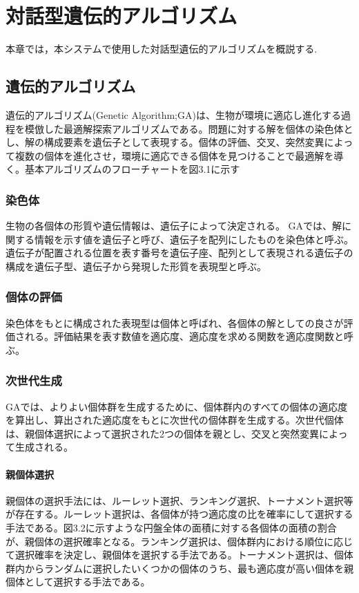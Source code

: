 \chapter{対話型遺伝的アルゴリズム}
本章では，本システムで使用した対話型遺伝的アルゴリズムを概説する.
\section{遺伝的アルゴリズム}
遺伝的アルゴリズム(Genetic Algorithm;GA)は、生物が環境に適応し進化する過程を模倣した最適解探索アルゴリズムである。問題に対する解を個体の染色体とし、解の構成要素を遺伝子として表現する。個体の評価、交叉、突然変異によって複数の個体を進化させ，環境に適応できる個体を見つけることで最適解を導く。基本アルゴリズムのフローチャートを図3.1に示す

\subsection{染色体}
生物の各個体の形質や遺伝情報は、遺伝子によって決定される。
GAでは、解に関する情報を示す値を遺伝子と呼び、遺伝子を配列にしたものを染色体と呼ぶ。
遺伝子が配置される位置を表す番号を遺伝子座、配列として表現される遺伝子の構成を遺伝子型、遺伝子から発現した形質を表現型と呼ぶ。

\subsection{個体の評価}
染色体をもとに構成された表現型は個体と呼ばれ、各個体の解としての良さが評価される。評価結果を表す数値を適応度、適応度を求める関数を適応度関数と呼ぶ。

\subsection{次世代生成}
GAでは、よりよい個体群を生成するために、個体群内のすべての個体の適応度を算出し、算出された適応度をもとに次世代の個体群を生成する。次世代個体は、親個体選択によって選択された2つの個体を親とし、交叉と突然変異によって生成される。

\subsubsection{親個体選択}
親個体の選択手法には、ルーレット選択、ランキング選択、トーナメント選択等が存在する。ルーレット選択は、各個体が持つ適応度の比を確率にして選択する手法である。図3.2に示すような円盤全体の面積に対する各個体の面積の割合が、親個体の選択確率となる。ランキング選択は、個体群内における順位に応じて選択確率を決定し、親個体を選択する手法である。トーナメント選択は、個体群内からランダムに選択したいくつかの個体のうち、最も適応度が高い個体を親個体として選択する手法である。


